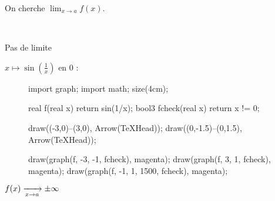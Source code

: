 \vspace{-5mm}
\vspace{1cm}


On cherche $\lim_{x\to a}f(x)$.\vspace{3mm}

~
\begin{multicols}{2}
	Pas de limite

	\ex $x \mapsto \sin\left( \frac{1}{x} \right)$ en $0$ : 

	\begin{figure}[H]
		\centering
		\begin{asy}
			import graph;
			import math;
			size(4cm);

			real f(real x) { return sin(1/x); }
			bool3 fcheck(real x) { return x != 0; }

			draw((-3,0)--(3,0), Arrow(TeXHead));
			draw((0,-1.5)--(0,1.5), Arrow(TeXHead));

			draw(graph(f, -3, -1, fcheck), magenta);
			draw(graph(f, 3, 1, fcheck), magenta);
			draw(graph(f, -1, 1, 1500, fcheck), magenta);
		\end{asy}
	\end{figure}
\end{multicols}

$f(x)\xrightarrow[x\to a]{}\pm\infty$ 

